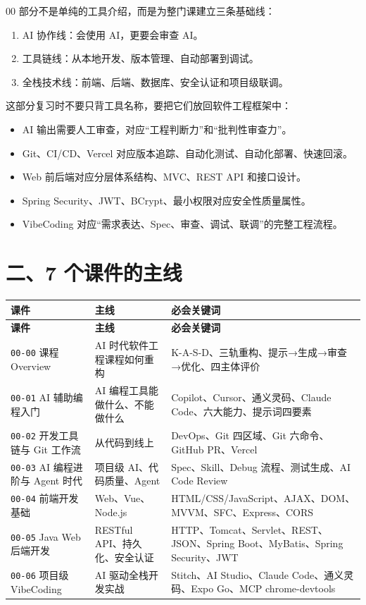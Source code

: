 \documentclass[UTF8,zihao=-4]{ctexart}
\begin{document}
00 部分不是单纯的工具介绍，而是为整门课建立三条基础线：

\begin{enumerate}
\item AI 协作线：会使用 AI，更要会审查 AI。
\item 工具链线：从本地开发、版本管理、自动部署到调试。
\item 全栈技术线：前端、后端、数据库、安全认证和项目级联调。
\end{enumerate}

这部分复习时不要只背工具名称，要把它们放回软件工程框架中：

\begin{itemize}
\item AI 输出需要人工审查，对应“工程判断力”和“批判性审查力”。
\item Git、CI/CD、Vercel 对应版本追踪、自动化测试、自动化部署、快速回滚。
\item Web 前后端对应分层体系结构、MVC、REST API 和接口设计。
\item Spring Security、JWT、BCrypt、最小权限对应安全性质量属性。
\item VibeCoding 对应“需求表达、Spec、审查、调试、联调”的完整工程流程。
\end{itemize}

\section{二、7 个课件的主线}

{
\footnotesize
\begin{longtable}{|>{\raggedright\arraybackslash}p{}|>{\raggedright\arraybackslash}p{}|>{\raggedright\arraybackslash}p{}|}
\hline
\textbf{课件} & \textbf{主线} & \textbf{必会关键词} \\
\hline
\endfirsthead
\hline
\textbf{课件} & \textbf{主线} & \textbf{必会关键词} \\
\hline
\endhead
\texttt{00-00} 课程 Overview & AI 时代软件工程课程如何重构 & K-A-S-D、三轨重构、提示→生成→审查→优化、四主体评价 \\
\hline
\texttt{00-01} AI 辅助编程入门 & AI 编程工具能做什么、不能做什么 & Copilot、Cursor、通义灵码、Claude Code、六大能力、提示词四要素 \\
\hline
\texttt{00-02} 开发工具链与 Git 工作流 & 从代码到线上 & DevOps、Git 四区域、Git 六命令、GitHub PR、Vercel \\
\hline
\texttt{00-03} AI 编程进阶与 Agent 时代 & 项目级 AI、代码质量、Agent & Spec、Skill、Debug 流程、测试生成、AI Code Review \\
\hline
\texttt{00-04} 前端开发基础 & Web、Vue、Node.js & HTML/CSS/JavaScript、AJAX、DOM、MVVM、SFC、Express、CORS \\
\hline
\texttt{00-05} Java Web 后端开发 & RESTful API、持久化、安全认证 & HTTP、Tomcat、Servlet、REST、JSON、Spring Boot、MyBatis、Spring Security、JWT \\
\hline
\texttt{00-06} 项目级 VibeCoding & AI 驱动全栈开发实战 & Stitch、AI Studio、Claude Code、通义灵码、Expo Go、MCP chrome-devtools \\
\hline
\end{longtable}
}
\end{document}
